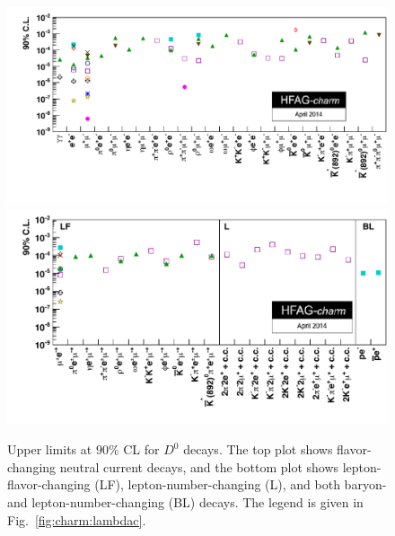 \begin{figure}
\begin{center}
\includegraphics[width=6.0in]{figures/charm/rare_D0_1.pdf}
\vskip-0.10in
\includegraphics[width=6.0in]{figures/charm/rare_D0_2.pdf}
\caption{Upper limits at $90\%$ CL for $D^0$ decays. The top plot
shows flavor-changing neutral current decays, and the bottom plot
shows lepton-flavor-changing (LF), lepton-number-changing (L), and 
both baryon- and lepton-number-changing (BL) decays.
The legend is given in Fig.~\ref{fig:charm:lambdac}.}
\label{fig:charm:rare_d0}
\end{center}
\end{figure}

